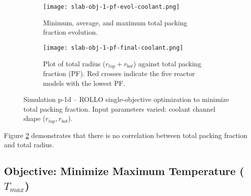 \begin{figure}[htbp]
    \centering
    \begin{subfigure}{\textwidth}
        \texttt{[image: slab-obj-1-pf-evol-coolant.png]}
        \caption{Minimum, average, and maximum total packing fraction evolution.}
        \label{fig:slab-obj-1-pf-evol-coolant} 
    \end{subfigure}
    \begin{subfigure}{\textwidth}
        \texttt{[image: slab-obj-1-pf-final-coolant.png]}
        \caption{Plot of total radius ($r_{top} + r_{bot}$) against total packing 
        fraction (PF). Red crosses indicate the five reactor models with the 
        lowest PF.}
        \label{fig:slab-obj-1-pf-final-coolant} 
    \end{subfigure}
    \caption{Simulation p-1d -- ROLLO single-objective optimization to minimize total 
    packing fraction. Input parameters varied: coolant channel shape 
    ($r_{top}, r_{bot}$).}
    \label{fig:slab-obj-1-pf-coolant}
\end{figure}
Figure \ref{fig:slab-obj-1-pf-final-coolant} demonstrates that there is no correlation 
between total packing fraction and total radius. 


\subsection{Objective: Minimize Maximum Temperature ($T_{max}$)}
\label{sec:plank-1-obj-temp}
